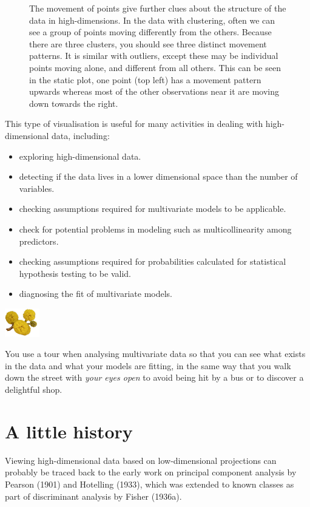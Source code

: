 \documentclass[
  letterpaper,
]{krantz}
\providecommand{\tightlist}{%
  \setlength{\itemsep}{0pt}\setlength{\parskip}{0pt}}\usepackage{longtable,booktabs,array}
\newcommand{\infobox}[1]{%
\noindent\colorbox{info!30}{%
\begin{minipage}{0.98\linewidth}%
    \centering%
    \begin{minipage}[c]{0.15\linewidth} %
      \includegraphics[width=1.5cm]{images/mulga-flowers2.png} %
    \end{minipage}%
    \hfill %
    \begin{minipage}[c]{0.8\linewidth} %
      \bigskip%
      \textsf{#1}%
      \bigskip%
    \end{minipage}%
    \hspace*{3mm}%
  \end{minipage}%
}%
}
\begin{document}
\begin{figure}
\begin{minipage}{0.50\linewidth}
{}


\end{minipage}%

\caption{\label{fig-trails}The movement of points give further clues
about the structure of the data in high-dimensions. In the data with
clustering, often we can see a group of points moving differently from
the others. Because there are three clusters, you should see three
distinct movement patterns. It is similar with outliers, except these
may be individual points moving alone, and different from all others.
This can be seen in the static plot, one point (top left) has a movement
pattern upwards whereas most of the other observations near it are
moving down towards the right.}

\end{figure}%

This type of visualisation is useful for many activities in dealing with
high-dimensional data, including:

\begin{itemize}
\tightlist
\item
  exploring high-dimensional data.
\item
  detecting if the data lives in a lower dimensional space than the
  number of variables.
\item
  checking assumptions required for multivariate models to be
  applicable.
\item
  check for potential problems in modeling such as multicollinearity
  among predictors.
\item
  checking assumptions required for probabilities calculated for
  statistical hypothesis testing to be valid.
\item
  diagnosing the fit of multivariate models.
\end{itemize}

\infobox{You use a tour when analysing multivariate data so that you can see what exists in the data and what your models are fitting, in the same way that you walk down the street with {\em your eyes open} to avoid being hit by a bus or to discover a delightful shop.}

\section{A little history}\label{a-little-history}

Viewing high-dimensional data based on low-dimensional projections can
probably be traced back to the early work on principal component
analysis by Pearson (1901) and Hotelling (1933), which was extended to
known classes as part of discriminant analysis by Fisher (1936a).
\end{document}
